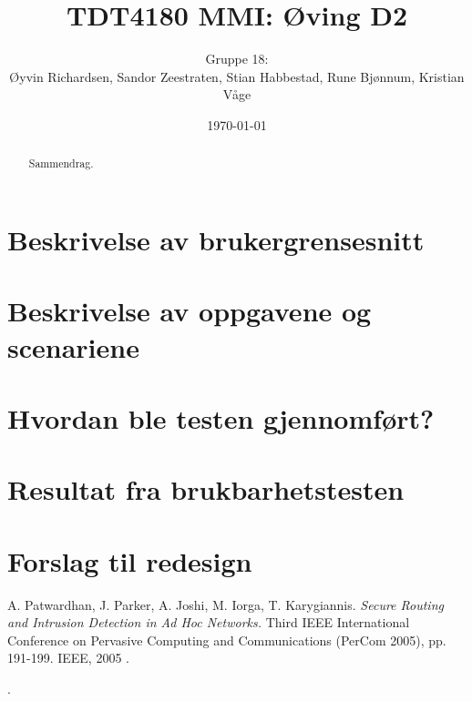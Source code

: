 \documentclass[a4paper,11pt]{article}
\title{TDT4180 MMI: Øving D2}
\author{Gruppe 18: \\ Øyvin Richardsen, Sandor Zeestraten, Stian Habbestad, Rune Bjønnum, Kristian Våge}
\date{\today}
\begin{document}
\maketitle

\begin{abstract}
Sammendrag.
\end{abstract}

\tableofcontents

\newpage

\section{Beskrivelse av brukergrensesnitt}


\section{Beskrivelse av oppgavene og scenariene}


\section{Hvordan ble testen gjennomført?}


\section{Resultat fra brukbarhetstesten}


\section{Forslag til redesign}


\footnotesize{  %
\begin{thebibliography}{N}

 A. Patwardhan, J. Parker, A. Joshi, M. Iorga, T. Karygiannis.
\textit{Secure Routing and Intrusion Detection in Ad Hoc Networks.}
Third IEEE International Conference on Pervasive Computing and Communications (PerCom 2005), pp. 191-199. IEEE, 2005 .


\end{thebibliography}.  
}




\end{document}
